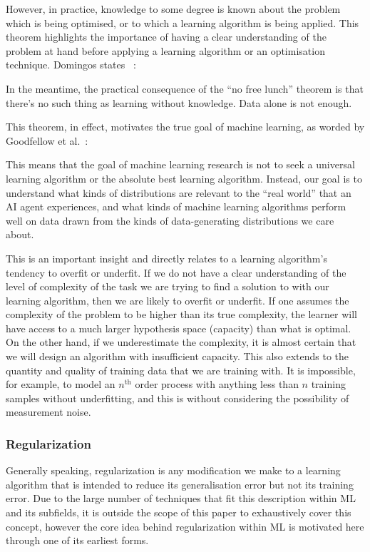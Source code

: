 However, in practice, knowledge to some degree is known about the problem which
is being optimised, or to which a learning algorithm is being applied. This
theorem highlights the importance of having a clear understanding of the problem
at hand before applying a learning algorithm or an optimisation technique.
Domingos states ~\cite{Domingos15}:

\begin{fancyquotes}
    In the meantime, the practical consequence of the “no free lunch”
    theorem is that there’s no such thing as learning without knowledge. Data
    alone is not enough.
\end{fancyquotes}

This theorem, in effect, motivates the true goal of machine learning, as worded
by Goodfellow et al.~\cite[p.~116]{Goodfellow-et-al-2016}:

\begin{fancyquotes}
    This means that the goal of machine learning research is not to seek
    a universal learning algorithm or the absolute best learning algorithm.
    Instead, our goal is to understand what kinds of distributions are relevant
    to the “real world” that an AI agent experiences, and what kinds of machine
    learning algorithms perform well on data drawn from the kinds of
    data-generating distributions we care about.
\end{fancyquotes}


This is an important insight and directly relates to a learning algorithm's
tendency to overfit or underfit. If we do not have a clear understanding of the
level of complexity of the task we are trying to find a solution to with our
learning algorithm, then we are likely to overfit or underfit. If one assumes
the complexity of the problem to be higher than its true complexity, the learner
will have access to a much larger hypothesis space (capacity) than what is
optimal. On the other hand, if we underestimate the complexity, it is almost
certain that we will design an algorithm with insufficient capacity. This also
extends to the quantity and quality of training data that we are training with.
It is impossible, for example, to model an $n^\text{th}$ order process with anything less
than $n$ training samples without underfitting, and this is without considering
the possibility of measurement noise.

\subsubsection{Regularization}
Generally speaking, regularization is any modification we make to a learning
algorithm that is intended to reduce its generalisation error but not its
training error. Due to the large number of techniques that fit this description
within \gls{ML} and its subfields, it is outside the scope of this paper to
exhaustively cover this concept, however the core idea behind regularization
within \gls{ML} is motivated here through one of its earliest forms.

